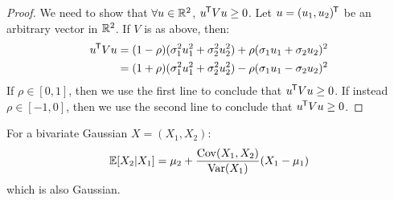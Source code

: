 \documentclass[../main.tex]{subfiles}
\begin{document}
\begin{proof}
  We need to show that $\forall u \in \mathbb{R}^2$, $u^{{\mkern-1.5mu\mathsf{T}}}Vu \geq 0$.
  Let $u = (u_1, u_2)^{{\mkern-1.5mu\mathsf{T}}}$ be an arbitrary vector in $\mathbb{R}^2$.
  If $V$ is as above, then:
  \begin{align*}
    u^{{\mkern-1.5mu\mathsf{T}}} V u &= (1 - \rho)(\sigma^2_1 u^2_1 + \sigma^2_2 u^2_2) + \rho(\sigma_1 u_1 + \sigma_2 u_2)^2 \\
                   &= (1 + \rho)(\sigma^2_1 u^2_1 + \sigma^2_2 u^2_2) - \rho(\sigma_1 u_1 - \sigma_2 u_2)^2
  \end{align*}
  If $\rho \in [0, 1]$, then we use the first line to conclude that $u^{{\mkern-1.5mu\mathsf{T}}} V u \geq 0$.
  If instead $\rho \in [-1, 0]$, then we use the second line to conclude that $u^{{\mkern-1.5mu\mathsf{T}}} V u \geq 0$.
\end{proof}
\begin{lemma}
  For a bivariate Gaussian $X = (X_1, X_2)$:
  \[
    \mathbb{E}[X_2 \vert X_1] = \mu_2 + \frac{\operatorname{Cov}(X_1, X_2)}{\operatorname{Var}(X_1)}(X_1 - \mu_1)
  \]
  which is also Gaussian.
\end{lemma}
\end{document}
